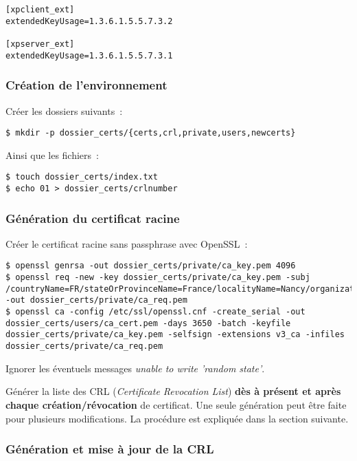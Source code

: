 \begin{lstlisting}
[xpclient_ext]
extendedKeyUsage=1.3.6.1.5.5.7.3.2

[xpserver_ext]
extendedKeyUsage=1.3.6.1.5.5.7.3.1
\end{lstlisting}

\subsubsection{Création de l'environnement}

Créer les dossiers suivants~:

\begin{lstlisting}
$ mkdir -p dossier_certs/{certs,crl,private,users,newcerts}
\end{lstlisting}

Ainsi que les fichiers~:

\begin{lstlisting}
$ touch dossier_certs/index.txt
$ echo 01 > dossier_certs/crlnumber
\end{lstlisting}

\subsubsection{Génération du certificat racine}

Créer le certificat racine sans passphrase avec OpenSSL~:

\begin{lstlisting}
$ openssl genrsa -out dossier_certs/private/ca_key.pem 4096 
$ openssl req -new -key dossier_certs/private/ca_key.pem -subj /countryName=FR/stateOrProvinceName=France/localityName=Nancy/organizationName=BHConsulting/commonName=nom_entreprise/ -out dossier_certs/private/ca_req.pem
$ openssl ca -config /etc/ssl/openssl.cnf -create_serial -out dossier_certs/users/ca_cert.pem -days 3650 -batch -keyfile dossier_certs/private/ca_key.pem -selfsign -extensions v3_ca -infiles dossier_certs/private/ca_req.pem
\end{lstlisting}

Ignorer les éventuels messages \og{}\emph{unable to write 'random state'}\fg.

Générer la liste des CRL (\emph{Certificate Revocation List}) \textbf{dès à présent et après chaque création/révocation} de certificat. Une seule génération peut être faite pour plusieurs modifications. La procédure est expliquée dans la section suivante.

\subsubsection{Génération et mise à jour de la CRL}
\label{gen-crl}

